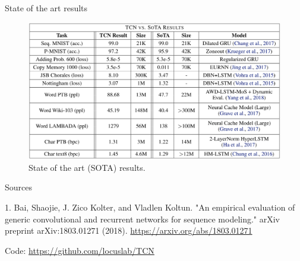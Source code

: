 \documentclass{beamer}
\begin{document}
\begin{frame}{State of the art results}
\begin{figure}[h]
\includegraphics[width=1.0\textwidth]{img/sota}
\caption{State of the art (SOTA) results. }
\end{figure}
\end{frame}


\begin{frame}{Sources}

\begin{thebibliography}{0}

   1. Bai, Shaojie, J. Zico Kolter, and Vladlen Koltun. "An empirical evaluation of generic convolutional and recurrent networks for sequence modeling." arXiv preprint arXiv:1803.01271 (2018). \url{https://arxiv.org/abs/1803.01271} 
  
  Code: \url{https://github.com/locuslab/TCN}
  
\end{thebibliography}

\end{frame}

 
 
 
\end{document}
